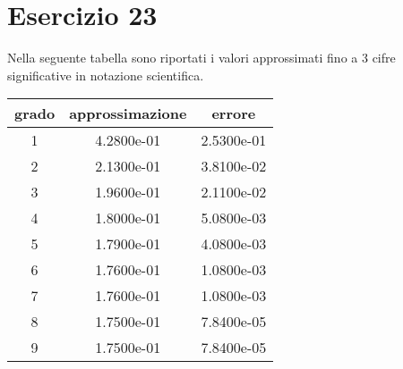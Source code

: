 \section{Esercizio 23}
Nella seguente tabella sono riportati i valori approssimati fino a 3 cifre significative in notazione scientifica.
\begin{table}[ht]
	\centering
	\small
	\begin{tabular}{| c| c | c|}
	\hline
	grado & approssimazione& errore\\
	\hline
	1 & 4.2800e-01 & 2.5300e-01\\
	\hline
	2 &2.1300e-01&3.8100e-02\\
	\hline
	3 & 1.9600e-01 & 2.1100e-02\\
	\hline
	4 & 1.8000e-01 &5.0800e-03\\
	\hline
	5 & 1.7900e-01&4.0800e-03  \\
	\hline
	6 &1.7600e-01&1.0800e-03 \\
	\hline
	7 & 1.7600e-01 & 1.0800e-03\\
	\hline
	8 & 1.7500e-01 &  7.8400e-05\\
	\hline
	9 & 1.7500e-01  &7.8400e-05\\
	\hline
	\end{tabular}
\end{table}